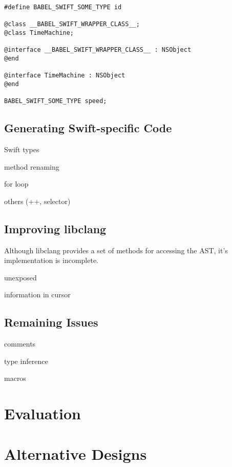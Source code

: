 \documentclass{sfuthesis}
\begin{document}
\begin{lstlisting}[frame=single]
#define BABEL_SWIFT_SOME_TYPE id

@class __BABEL_SWIFT_WRAPPER_CLASS__;
@class TimeMachine;

@interface __BABEL_SWIFT_WRAPPER_CLASS__ : NSObject
@end

@interface TimeMachine : NSObject
@end

BABEL_SWIFT_SOME_TYPE speed;
\end{lstlisting}


\section{Generating Swift-specific Code}

Swift types

method renaming

for loop

others (++, selector)

\section{Improving libclang}

Although libclang provides a set of methods for accessing the AST, it's implementation is incomplete.

unexposed

information in cursor


\section{Remaining Issues}

comments

type inference

macros

\chapter{Evaluation}

\chapter{Alternative Designs}
\end{document}
